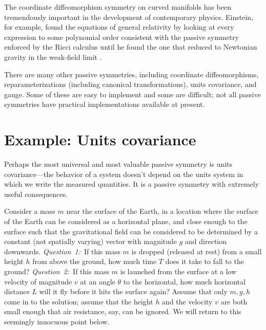 \documentclass{article}
\theoremstyle{plain}
\theoremstyle{definition}
\theoremstyle{remark}
\begin{document}
The coordinate diffeomorphism symmetry on curved manifolds has been tremendously important in the development of contemporary physics.
Einstein, for example, found the equations of general relativity by looking at every expression to some polynomial order consistent with the passive symmetry enforced by the Ricci calculus until he found the one that reduced to Newtonian gravity in the weak-field limit \cite{gr}.

There are many other passive symmetries, including coordinate diffeomorphisms, reparameterizations (including canonical transformations), units covariance, and gauge.
Some of these are easy to implement and some are difficult;
not all passive symmetries have practical implementations available at present.

\section{Example: Units covariance}\label{sec:units}

Perhaps the most universal and most valuable passive symmetry is units covariance---the behavior of a system doesn't depend on the units system in which we write the measured quantities.
It is a passive symmetry with extremely useful consequences.

Consider a mass $m$ near the surface of the Earth, in a location where the surface of the Earth can be considered as a horizontal plane, and close enough to the surface such that the gravitational field can be considered to be determined by a constant (not spatially varying) vector with magnitude $g$ and direction downwards.
\textsl{Question~1:}~If this mass $m$ is dropped (released at rest) from a small height $h$ from above the ground, how much time $T$ does it take to fall to the ground?
\textsl{Question~2:}~If this mass $m$ is launched from the surface at a low velocity of magnitude $v$ at an angle $\theta$ to the horizontal, how much horizontal distance $L$ will it fly before it hits the surface again?
Assume that only $m, g, h$ come in to the solution; assume that the height $h$ and the velocity $v$ are both small enough that air resistance, say, can be ignored.
We will return to this seemingly innocuous point below.
\end{document}
